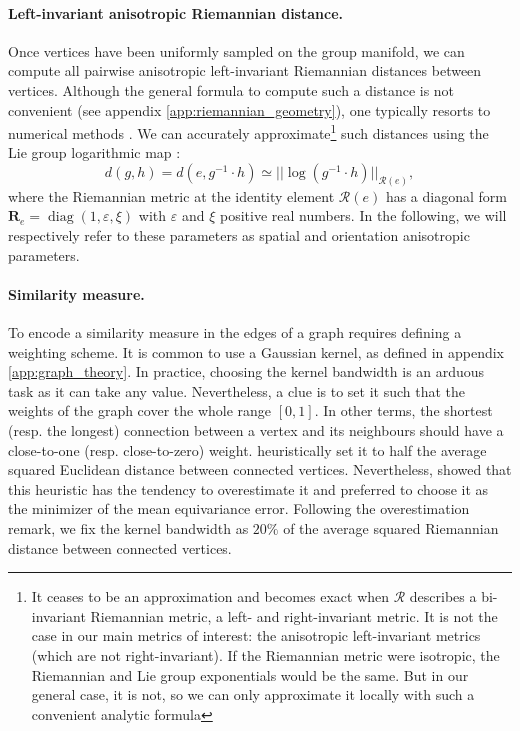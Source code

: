 \documentclass{article}
\DeclareMathOperator{\diag}{diag}
\begin{document}
\paragraph{Left-invariant anisotropic Riemannian distance.} Once vertices have been uniformly sampled on the group manifold, we can compute all pairwise anisotropic left-invariant Riemannian distances between vertices. Although the general formula to compute such a distance is not convenient (see appendix \ref{app:riemannian_geometry}), one typically resorts to numerical methods \citep{sanguinetti2015fastmarching}. We can accurately approximate\footnote{It ceases to be an approximation and becomes exact when $\mathcal{R}$ describes a bi-invariant Riemannian metric, a left- and right-invariant metric. It is not the case in our main metrics of interest: the anisotropic left-invariant metrics (which are not right-invariant). If the Riemannian metric were isotropic, the Riemannian and Lie group exponentials would be the same. But in our general case, it is not, so we can only approximate it locally with such a convenient analytic formula} such distances using the Lie group logarithmic map \citep{bekkers2018nilpotent}:
\begin{equation}
d(g, h) = d(e, g^{-1} \cdot h) \simeq ||\log (g^{-1} \cdot h)||_{\mathcal{R}(e)},
\end{equation}
where the Riemannian metric at the identity element $\mathcal{R}(e)$ has a diagonal form $\boldsymbol{R}_e = \diag (1, \varepsilon, \xi)$ with $\varepsilon$ and $\xi$ positive real numbers. In the following, we will respectively refer to these parameters as spatial and orientation anisotropic parameters.

\paragraph{Similarity measure.} To encode a similarity measure in the edges of a graph requires defining a weighting scheme. It is common to use a Gaussian kernel, as defined in appendix \ref{app:graph_theory}. In practice, choosing the kernel bandwidth is an arduous task as it can take any value. Nevertheless, a clue is to set it such that the weights of the graph cover the whole range $[0, 1]$. In other terms, the shortest (resp. the longest) connection between a vertex and its neighbours should have a close-to-one (resp. close-to-zero) weight. \cite{perraudin2019deepsphere} heuristically set it to half the average squared Euclidean distance between connected vertices. Nevertheless, \cite{defferrard2020deepsphere} showed that this heuristic has the tendency to overestimate it and preferred to choose it as the minimizer of the mean equivariance error. Following the overestimation remark, we fix the kernel bandwidth as $20\%$ of the average squared Riemannian distance between connected vertices.
\end{document}
